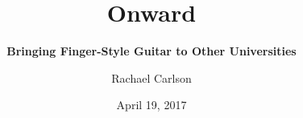 \documentclass[xetex,mathserif]{beamer}
\title{\textbf{Onward}}
\subtitle{\textbf{Bringing Finger-Style Guitar to Other Universities}}
\author{Rachael Carlson}
\institute{University of Wisconsin-Milwaukee\\Finger-Style Guitar Program}
\date{April 19, 2017}
\begin{document}
\begin{frame}
\titlepage
\end{frame}
\end{document}
